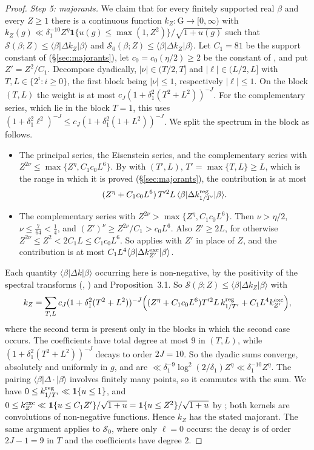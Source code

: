 \documentclass[11pt]{amsart}
\theoremstyle{remark}
\theoremstyle{definition}
\numberwithin{equation}{section}
\newcommand{\G}{\mathrm{G}}
\newcommand{\one}{\mathbf{1}}
\newcommand{\br}[1]{\langle #1\rangle}
\begin{document}
\begin{proof}
\emph{Step 5: majorants.} We claim that for every finitely supported real $\beta$ and every $Z\ge1$ there is a continuous function $k_Z:\G\to[0,\infty)$ with $k_Z(g)\ll\delta_1^{-10}Z^{\eta}\one\{u(g)\le\max(1,Z^2)\}/\sqrt{1+u(g)}$ such that $\mathcal S(\beta;Z)\le\br{\beta|\Delta k_Z|\beta}$ and $\mathcal S_0(\beta;Z)\le\br{\beta|\Delta k_Z|\beta}$. Let $C_1=81$ be the support constant of \cite[Lemma~6.4]{GM1} (\S\ref{sec:majorants}), let $c_0=c_0(\eta/2)\ge2$ be the constant of \cite[Proposition~6.2]{GM1}, and put $Z'=Z^2/C_1$. Decompose dyadically, $|\nu|\in(T/2,T]$ and $|\ell|\in(L/2,L]$ with $T,L\in\{2^i:i\ge0\}$, the first block being $|\nu|\le1$, respectively $|\ell|\le1$. On the block $(T,L)$ the weight is at most $c_J(1+\delta_1^2(T^2+L^2))^{-J}$. For the complementary series, which lie in the block $T=1$, this uses $(1+\delta_1^2\ell^2)^{-J}\le c_J(1+\delta_1^2(1+L^2))^{-J}$. We split the spectrum in the block as follows.
\begin{itemize}
\item The principal series, the Eisenstein series, and the complementary series with $Z^{2\nu}\le\max\{Z^{\eta},C_1c_0L^6\}$. By \cite[Proposition~6.1]{GM1} with $(T',L)$, $T'=\max\{T,L\}\ge L$, which is the range in which it is proved (\S\ref{sec:majorants}), the contribution is at most
\[
(Z^\eta+C_1c_0L^6)\,T'^2L\,\br{\beta|\Delta k^{\rm reg}_{1/T'}|\beta}.
\]
\item The complementary series with $Z^{2\nu}>\max\{Z^{\eta},C_1c_0L^6\}$. Then $\nu>\eta/2$, $\nu\le\frac7{64}<\frac14$, and $(Z')^{\nu}\ge Z^{2\nu}/C_1>c_0L^6$. Also $Z'\ge2L$, for otherwise $Z^{2\nu}\le Z^2<2C_1L\le C_1c_0L^6$. So \cite[Proposition~6.2]{GM1} applies with $Z'$ in place of $Z$, and the contribution is at most $C_1L^4\br{\beta|\Delta k^{\rm exc}_{Z'}|\beta}$.
\end{itemize}
Each quantity $\br{\beta|\Delta k|\beta}$ occurring here is non-negative, by the positivity of the spectral transforms (\cite[Lemma~6.3]{GM1}, \cite[Lemma~6.4]{GM0}) and Proposition~3.1. So $\mathcal S(\beta;Z)\le\br{\beta|\Delta k_Z|\beta}$ with
\[
k_Z=\sum_{T,L}c_J(1+\delta_1^2(T^2+L^2))^{-J}\Bigl((Z^\eta+C_1c_0L^6)T'^2L\,k^{\rm reg}_{1/T'}+C_1L^4k^{\rm exc}_{Z'}\Bigr),
\]
where the second term is present only in the blocks in which the second case occurs. The coefficients have total degree at most $9$ in $(T,L)$, while $(1+\delta_1^2(T^2+L^2))^{-J}$ decays to order $2J=10$. So the dyadic sums converge, absolutely and uniformly in $g$, and are $\ll\delta_1^{-9}\log^2(2/\delta_1)Z^\eta\ll\delta_1^{-10}Z^\eta$. The pairing $\br{\beta|\Delta\cdot|\beta}$ involves finitely many points, so it commutes with the sum. We have $0\le k^{\rm reg}_{1/T'}\ll\one\{u\le1\}$, and $0\le k^{\rm exc}_{Z'}\ll\one\{u\le C_1Z'\}/\sqrt{1+u}=\one\{u\le Z^2\}/\sqrt{1+u}$ by \cite[Lemma~6.4]{GM1}; both kernels are convolutions of non-negative functions. Hence $k_Z$ has the stated majorant. The same argument applies to $\mathcal S_0$, where only $\ell=0$ occurs: the decay is of order $2J-1=9$ in $T$ and the coefficients have degree $2$.


\end{proof}
\end{document}
